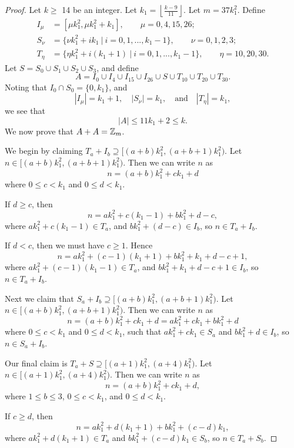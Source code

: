 \begin{proof}
Let $k \geq$ 14 be an integer. Let $k_1 = \left \lfloor \frac{k - 9}{11} \right \rfloor$. Let $m = 37k_1^2$.  Define 
\begin{align*}
I_\mu &= [\mu k_1^2, \mu k_1^2 + k_1], \qquad
\mu = 0, 4, 15, 26; \\
S_\nu &= \{\nu k_1^2 + ik_1 \ |\  i = 0 , 1, ... , k_1 - 1\},\qquad
\nu = 0, 1, 2, 3;\\
T_{\eta} &= \{\eta k_1^2+ i(k_1 + 1) \ |\   i = 0 , 1, ... , k_1 -1\},\qquad
\eta = 10, 20, 30.
\end{align*}
 Let $S= S_{0} \cup S_{1} \cup S_{2} \cup S_{3}$, and
define
\[
A=I_0\cup I_4\cup I_{15}\cup I_{26}\cup S\cup T_{10}\cup T_{20}\cup T_{30}.
\]
Noting  that $I_0\cap S_0=\{0,k_1\}$, and 
\[
|I_\mu| = k_1 + 1,\quad 
|S_\nu| = k_1,\quad\text{and}\quad
|T_\eta| = k_1,
\]
we see that 
\[
|A| \leq 11k_1 + 2 \leq k.
\]  
We now prove that $A+A=\mbox{$\mathbb Z$}_m$.

We begin by claiming $T_a + I_b\supseteq[(a + b)k_1^2 ,  (a + b + 1)k_1^2)$. Let $n \in[(a + b)k_1^2 ,  (a + b + 1)k_1^2)$.
Then we can write $n$ as 
\[
n = (a + b) k_1^2 + ck_1 + d
\]
where $0 \leq c < k_1$ and $0 \leq d < k_1$.

If $d \geq c$, then
\[
n = ak_1^2 + c(k_1- 1) + bk_1^2 +  d - c,
\]
where $ak_1^2 +c(k_1- 1) \in T_a$, and $bk_1^2 + (d - c) \in I_b$, so $n \in T_a + I_b$. 

If $d < c$, then we must have $c \geq 1$. Hence
\[
n = ak_1^2 + (c - 1)(k_1 + 1) + bk_1^2 + k_1 + d - c + 1, 
\]
where $ak_1^2 + (c - 1)(k_1 - 1) \in T_a$, and $bk_1^2 + k_1 + d - c + 1 \in I_b$, so $n \in T_a + I_b$. 

Next we claim that  $S_a + I_b\supseteq[(a + b)k_1^2 ,  (a + b + 1)k_1^2)$. Let $n \in[(a + b)k_1^2 ,  (a + b + 1)k_1^2)$.
Then we can write $n$ as 
\[
n = (a + b) k_1^2 + ck_1 + d = ak_1^2 + ck_1 + bk_1^2 + d
\]
where  $0 \leq c < k_1$ and $0 \leq d < k_1$, such that $ak_1^2 + ck_1 \in S_a$ and $bk_1^2 + d \in I_b$, so $n \in S_a + I_b$. 

Our final claim is $T_a + S \supseteq[(a +1)k_1^2 ,  (a + 4)k_1^2)$.  Let $n \in[(a +1)k_1^2 ,  (a + 4)k_1^2)$.
Then we can write $n$ as 
\[
n = (a + b) k_1^2 + ck_1 + d, 
\]
where $1 \leq b \leq 3$, $0 \leq c < k_1$, and $0 \leq d < k_1$. 

If $c \geq d$, then
\[
n = ak_1^2 + d(k_1 + 1) + bk_1^2 + (c - d) k_1, 
\]
where $ak_1^2 + d(k_1 + 1) \in T_a$ and $bk_1^2 + (c - d)k_1 \in S_b$, so $n \in T_a + S_b$. 


\end{proof}
